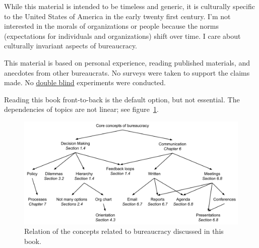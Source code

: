 

While this material is intended to be timeless and generic, it is culturally specific to the United States of America in the early twenty first century. %
I'm not interested in the morals of organizations or people because the norms (expectations for individuals and organizations) shift over time. 
I care about culturally invariant aspects of bureaucracy. 

This material is based on personal experience, reading published materials, and anecdotes from other bureaucrats. No surveys were taken to support the claims made. No \href{https://en.wikipedia.org/wiki/Blinded_experiment}{double blind} experiments were conducted. 

Reading this book front-to-back is the default option, but not essential. The dependencies of topics are not linear; see figure~\ref{fig:core-concepts}.

\begin{figure}[ht]
    \centering
    \includegraphics[width=1\textwidth]{images/core_concepts_map.pdf}
    \caption{Relation of the concepts related to bureaucracy discussed in this book. }
    \label{fig:core-concepts}
\end{figure}


